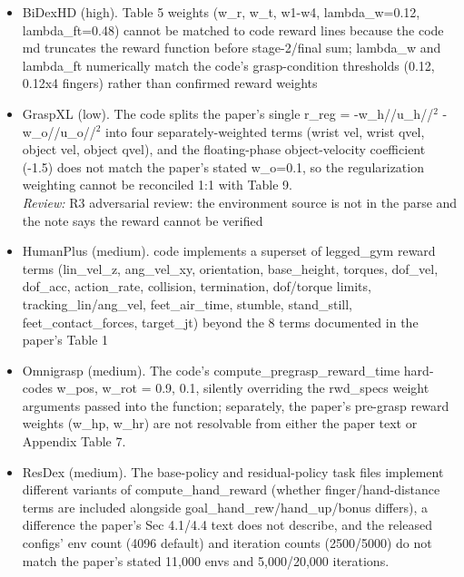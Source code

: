 \begin{itemize}
\item BiDexHD \cite{bidexhd_2024} (high). Table 5 weights (w\_\allowbreak{}r, w\_\allowbreak{}t, w1-w4, lambda\_\allowbreak{}w=0.12, lambda\_\allowbreak{}ft=0.48) cannot be matched to code reward lines because the code md truncates the reward function before stage-2/final sum; lambda\_\allowbreak{}w and lambda\_\allowbreak{}ft numerically match the code's grasp-condition thresholds (0.12, 0.12x4 fingers) rather than confirmed reward weights
\item GraspXL \cite{graspxl_2024} (low). The code splits the paper's single r\_\allowbreak{}reg = -w\_h//u\_h//$^{2}$ - w\_o//u\_o//$^{2}$ into four separately-weighted terms (wrist vel, wrist qvel, object vel, object qvel), and the floating-phase object-velocity coefficient (-1.5) does not match the paper's stated w\_\allowbreak{}o=0.1, so the regularization weighting cannot be reconciled 1:1 with Table 9.
  \\ \emph{Review:} R3 adversarial review: the environment source is not in the parse and the note says the reward cannot be verified
\item HumanPlus \cite{humanplus_2024} (medium). code implements a superset of legged\_\allowbreak{}gym reward terms (lin\_\allowbreak{}vel\_\allowbreak{}z, ang\_\allowbreak{}vel\_\allowbreak{}xy, orientation, base\_\allowbreak{}height, torques, dof\_\allowbreak{}vel, dof\_\allowbreak{}acc, action\_\allowbreak{}rate, collision, termination, dof/torque limits, tracking\_\allowbreak{}lin/ang\_\allowbreak{}vel, feet\_\allowbreak{}air\_\allowbreak{}time, stumble, stand\_\allowbreak{}still, feet\_\allowbreak{}contact\_\allowbreak{}forces, target\_\allowbreak{}jt) beyond the 8 terms documented in the paper's Table 1
\item Omnigrasp \cite{omnigrasp_2024} (medium). The code's compute\_\allowbreak{}pregrasp\_\allowbreak{}reward\_\allowbreak{}time hard-codes w\_\allowbreak{}pos, w\_\allowbreak{}rot = 0.9, 0.1, silently overriding the rwd\_\allowbreak{}specs weight arguments passed into the function; separately, the paper's pre-grasp reward weights (w\_\allowbreak{}hp, w\_\allowbreak{}hr) are not resolvable from either the paper text or Appendix Table 7.
\item ResDex \cite{resdex_2024} (medium). The base-policy and residual-policy task files implement different variants of compute\_\allowbreak{}hand\_\allowbreak{}reward (whether finger/hand-distance terms are included alongside goal\_\allowbreak{}hand\_\allowbreak{}rew/hand\_\allowbreak{}up/bonus differs), a difference the paper's Sec 4.1/4.4 text does not describe, and the released configs' env count (4096 default) and iteration counts (2500/5000) do not match the paper's stated 11,000 envs and 5,000/20,000 iterations.

\end{itemize}
